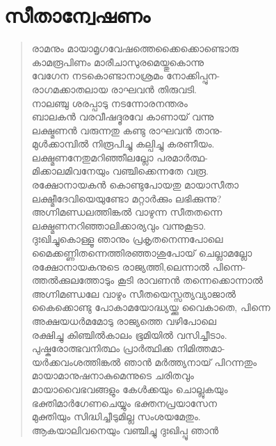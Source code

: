 \section{സീതാന്വേഷണം}

\begin{verse}
രാമനും മായാമൃഗവേഷത്തെക്കൈക്കൊണ്ടൊരു\\
കാമരൂപിണം മാരീചാസുരമെയ്തുകൊന്നു\\
വേഗേന നടകൊണ്ടാനാശ്രമം നോക്കിപ്പുന-\\
രാഗമക്കാതലായ രാഘവന്‍ തിരുവടി.\\
നാലഞ്ചു ശരപ്പാടു നടന്നോരനന്തരം\\
ബാലകന്‍ വരവീഷദ്ദൂരവേ കാണായ് വന്നു\\
ലക്ഷ്മണന്‍ വരുന്നതു കണ്ടു രാഘവന്‍ താനു-\\
മുള്‍ക്കാമ്പില്‍ നിരൂപിച്ചു കല്പിച്ചു കരണീയം.\\
ലക്ഷ്മണനേതുമറിഞ്ഞീലല്ലോ പരമാര്‍ത്ഥ-\\
മിക്കാലമിവനേയും വഞ്ചിക്കെന്നതേ വരൂ.\\
രക്ഷോനായകന്‍ കൊണ്ടുപോയതു മായാസീതാ\\
ലക്ഷ്മീദേവിയെയുണ്ടോ മറ്റാര്‍ക്കും ലഭിക്കുന്നു?\\
അഗ്നിമണ്ഡലത്തിങ്കല്‍ വാഴുന്ന സീതതന്നെ\\
ലക്ഷ്മണനറിഞ്ഞാലിക്കാര്യവും വന്നുകൂടാ.\\
ദുഃഖിച്ചുകൊള്ളൂ ഞാനും പ്രകൃതനെന്നപോലെ\\
മൈക്കണ്ണിതന്നെത്തിരഞ്ഞാശുപോയ് ചെല്ലാമല്ലോ\\
രക്ഷോനായകനുടെ രാജ്യത്തി,ലെന്നാല്‍ പിന്നെ-\\
ത്തല്‍ക്കുലത്തോടും കൂടി രാവണന്‍ തന്നെക്കൊന്നാല്‍\\
അഗ്നിമണ്ഡലേ വാഴും സീതയെസ്സത്യവ്യാജാല്‍\\
കൈക്കൊണ്ടു പോകാമയോദ്ധ്യയ്ക്കു വൈകാതെ, പിന്നെ\\
അക്ഷയധര്‍മമോടു രാജ്യത്തെ വഴിപോലെ\\
രക്ഷിച്ചു കിഞ്ചില്‍കാലം ഭൂമിയില്‍ വസിച്ചീടാം.\\
പുഷ്കരോത്ഭവനിത്ഥം പ്രാര്‍ത്ഥിക്ക നിമിത്തമാ-\\
യര്‍ക്കവംശത്തിങ്കല്‍ ഞാന്‍ മര്‍ത്ത്യനായ് പിറന്നതും\\
മായാമാനുഷനാകുമെന്നുടെ ചരിതവും\\
മായാവൈഭവങ്ങളും കേള്‍ക്കയും ചൊല്ലുകയും\\
ഭക്തിമാര്‍ഗേണചെയ്യും ഭക്തനപ്രയാസേന\\
മുക്തിയും സിദ്ധിച്ചീടുമില്ല സംശയമേതും.\\
ആകയാലിവനെയും വഞ്ചിച്ചു ദുഃഖിപ്പൂ ഞാന്‍\\

\end{verse}
